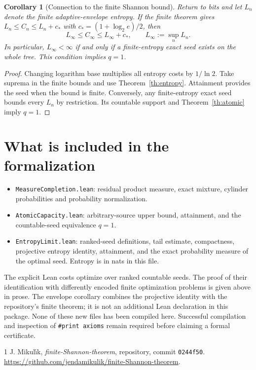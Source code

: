 \documentclass[11pt]{article}
\newtheorem{corollary}[theorem]{Corollary}
\begin{document}
\begin{corollary}[Connection to the finite Shannon bound]
Return to bits and let $L_n$ denote the finite adaptive-envelope entropy.
If the finite theorem gives
$L_n\le C_n\le L_n+c_*$ with $c_*=(1+\log_2 e)/2$, then
\[
 L_\infty\le C_\infty\le L_\infty+c_*,\qquad
 L_\infty:=\sup_n L_n.
\]
In particular, $L_\infty<\infty$ if and only if a finite-entropy exact
seed exists on the whole tree. This condition implies $q=1$.
\end{corollary}
\begin{proof}
Changing logarithm base multiplies all entropy costs by $1/\ln2$.
Take suprema in the finite bounds and use Theorem~\ref{th:entropy}.
Attainment provides the seed when the bound is finite. Conversely, any
finite-entropy exact seed bounds every $L_n$ by restriction. Its countable
support and Theorem~\ref{th:atomic} imply $q=1$.
\end{proof}

\section{What is included in the formalization}
\begin{itemize}
\item \texttt{MeasureCompletion.lean}: residual product measure, exact
mixture, cylinder probabilities and probability normalization.
\item \texttt{AtomicCapacity.lean}: arbitrary-source upper bound,
attainment, and the countable-seed equivalence $q=1$.
\item \texttt{EntropyLimit.lean}: ranked-seed definitions, tail estimate,
compactness, projective entropy identity, attainment, and the exact
probability measure of the optimal seed. Entropy is in nats in this file.
\end{itemize}
The explicit Lean costs optimize over ranked countable seeds. The proof
of their identification with differently encoded finite optimization
problems is given above in prose. The envelope corollary combines the
projective identity with the repository's finite theorem; it is not an
additional Lean declaration in this package. None of these new files has
been compiled here. Successful compilation and inspection of
\texttt{\#print axioms} remain required before claiming a formal certificate.

\begin{thebibliography}{1}
 J. Mikul\'{\i}k, \emph{finite-Shannon-theorem}, repository,
commit \texttt{0244f50}.
\url{https://github.com/jendamikulik/finite-Shannon-theorem}.
\end{thebibliography}
\end{document}
